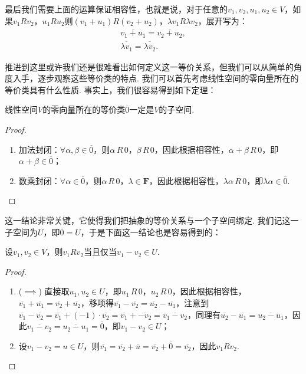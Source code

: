 最后我们需要上面的运算保证相容性，也就是说，对于任意的$v_1,v_2,u_1,u_2\in V$，如果$v_1Rv_2$，$u_1Ru_2$则$(v_1+u_1)R(v_2+u_2)$，$\lambda v_1R\lambda v_2$，展开写为：
\begin{gather*}
    \overline{v_1+u_1}=\overline{v_2+u_2},\\
    \overline{\lambda v_1}=\overline{\lambda v_2}.
\end{gather*}

推进到这里或许我们还是很难看出如何定义这一等价关系，但我们可以从简单的角度入手，逐步观察这些等价类的特点. 我们可以首先考虑线性空间的零向量所在的等价类具有什么性质. 事实上，我们很容易得到如下定理：
\begin{theorem}{}{}
    线性空间$V$的零向量所在的等价类$\overline{0}$一定是$V$的子空间.
\end{theorem}
\begin{proof}
    \begin{enumerate}
        \item 加法封闭：$\forall \alpha,\beta\in\overline{0}$，则$\alpha\,R\,0$，$\beta\,R\,0$，因此根据相容性，$\alpha+\beta\,R\,0$，即$\alpha+\beta\in\overline{0}$；
        \item 数乘封闭：$\forall \alpha\in\overline{0}$，则$\alpha\,R\,0$，$\lambda\in\mathbf{F}$，因此根据相容性，$\lambda\alpha\,R\,0$，即$\lambda\alpha\in\overline{0}$.
    \end{enumerate}
\end{proof}

这一结论非常关键，它使得我们把抽象的等价关系与一个子空间绑定. 我们记这一子空间为$U$，即$\overline{0}=U$，于是下面这一结论也是容易得到的：
\begin{theorem}{}{}
    设$v_1,v_2\in V$，则$v_1Rv_2$当且仅当$v_1-v_2\in U$.
\end{theorem}
\begin{proof}
    \begin{enumerate}
        \item ($\implies$) 直接取$u_1,u_2\in U$，即$u_1\,R\,0$，$u_2\,R\,0$，因此根据相容性，$\overline{v_1}+\overline{u_1}=\overline{v_2}+\overline{u_2}$，移项得$\overline{v_1}-\overline{v_2}=\overline{u_2}-\overline{u_1}$，注意到$\overline{v_1}-\overline{v_2}=\overline{v_1}+(-1)\cdot\overline{v_2}=\overline{v_1}+\overline{-v_2}=\overline{v_1-v_2}$，同理有$\overline{u_2}-\overline{u_1}=\overline{u_2-u_1}$，因此$\overline{v_1-v_2}=\overline{u_2-u_1}=\overline{0}$，即$v_1-v_2\in U$；
        \item 设$v_1-v_2=u\in U$，则$\overline{v_1}=\overline{v_2}+\overline{u}=\overline{v_2}+\overline{0}=\overline{v_2}$，因此$v_1Rv_2$.
    \end{enumerate}
\end{proof}

